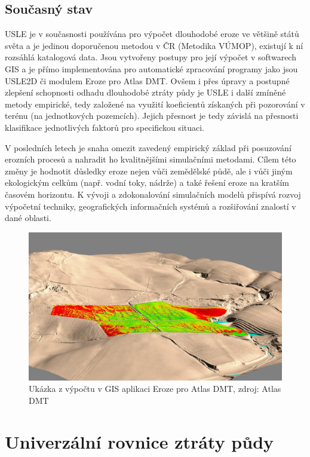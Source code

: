 \subsection{Současný stav}
USLE je v současnosti používána pro výpočet dlouhodobé eroze ve
většině států světa a je jedinou doporučenou metodou v ČR (Metodika
VÚMOP\cite{janecek2012}), existují k ní rozsáhlá katalogová data. Jsou
vytvořeny postupy pro její výpočet v softwarech GIS a je přímo
implementována pro automatické zpracování programy jako jsou USLE2D či
modulem Eroze pro Atlas DMT. Ovšem i přes úpravy a postupné zlepšení
schopnosti odhadu dlouhodobé ztráty půdy je USLE i další zmíněné
metody empirické, tedy založené na využití koeficientů získaných při
pozorování v terénu (na jednotkových pozemcích). Jejich přesnost je
tedy závislá na přesnosti klasifikace jednotlivých faktorů pro
specifickou situaci.

V posledních letech je snaha omezit zavedený empirický základ při
posuzování erozních procesů a nahradit ho kvalitnějšími simulačními
metodami. Cílem této změny je hodnotit důsledky eroze nejen vůči
zemědělské půdě, ale i vůči jiným ekologickým celkům (např. vodní
toky, nádrže) a také řešení eroze na kratším časovém horizontu.  K
vývoji a zdokonalování simulačních modelů přispívá rozvoj výpočetní
techniky, geografických informačních systémů a rozšiřování znalostí v
dané oblasti.\cite{janecek2012}
\begin{figure}[H]
    \centering
    \includegraphics[scale=0.25]{./pictures/atlas_eroze.jpg}
      \caption[Ukázka z výpočtu v GIS aplikaci Eroze pro Atlas
        DMT]{Ukázka z výpočtu v GIS aplikaci Eroze pro Atlas DMT,
        zdroj: Atlas DMT\cite{atlas_e}}
      \label{fig:atlas_eroze}
\end{figure}

\section{Univerzální rovnice ztráty půdy}
